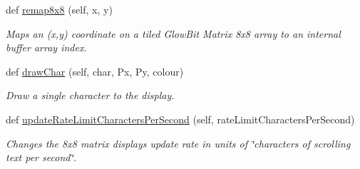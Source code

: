 \begin{DoxyCompactItemize}
def \hyperlink{classglowbit_1_1matrix8x8_a67146ad236571bf9e87fe7a847c8a1d1}{remap8x8} (self, x, y)
\begin{DoxyCompactList}\small\item\em Maps an (x,y) coordinate on a tiled Glow\+Bit Matrix 8x8 array to an internal buffer array index. \end{DoxyCompactList}\item 
def \hyperlink{classglowbit_1_1matrix8x8_a4ba16a1fa6231654833d619f8789275a}{draw\+Char} (self, char, Px, Py, colour)
\begin{DoxyCompactList}\small\item\em Draw a single character to the display. \end{DoxyCompactList}\item 
def \hyperlink{classglowbit_1_1matrix8x8_a5dfbe10ccf2acca4d6d4012e29e7b439}{update\+Rate\+Limit\+Characters\+Per\+Second} (self, rate\+Limit\+Characters\+Per\+Second)
\begin{DoxyCompactList}\small\item\em Changes the 8x8 matrix display\textquotesingle{}s update rate in units of \char`\"{}characters of scrolling text per second\char`\"{}. \end{DoxyCompactList}\end{DoxyCompactItemize}
